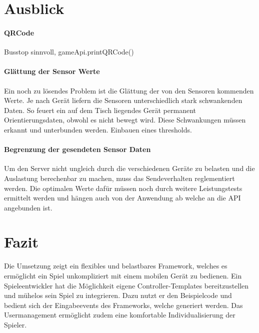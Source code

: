\documentclass[a4paper]{spie}  %
\begin{document}
\section{Ausblick}

\paragraph{QRCode} %
    Busstop sinnvoll, gameApi.printQRCode()
\paragraph{Glättung der Sensor Werte}
Ein noch zu lösendes Problem ist die Glättung der von den Sensoren kommenden Werte. Je nach Gerät liefern die Sensoren unterschiedlich stark schwankenden Daten. So feuert ein auf dem Tisch liegendes Gerät permanent Orientierungsdaten, obwohl es nicht bewegt wird. Diese Schwankungen müssen erkannt und unterbunden werden. Einbauen eines thresholds.

\paragraph{Begrenzung der gesendeten Sensor Daten}
Um den Server nicht ungleich durch die verschiedenen Geräte zu belasten und die Auslastung berechenbar zu machen, muss das Sendeverhalten reglementiert werden. Die optimalen Werte dafür müssen noch durch weitere Leistungstests ermittelt werden und hängen auch von der Anwendung ab welche an die API angebunden ist.


\section{Fazit}
Die Umsetzung zeigt ein flexibles und belastbares Framework, welches es ermöglicht ein Spiel unkompliziert mit einem mobilen Gerät zu bedienen.
Ein Spieleentwickler hat die Möglichkeit eigene Controller-Templates bereitzustellen und mühelos sein Spiel zu integrieren.
Dazu nutzt er den Beispielcode und bedient sich der Eingabeevents des Frameworks, welche generiert werden. Das Usermanagement ermöglicht zudem eine komfortable Individualisierung der Spieler.




 \renewcommand{\bibname}{Referenzen}

\nocite{}
\end{document}
